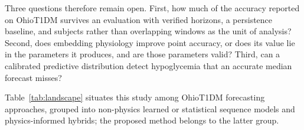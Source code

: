 \documentclass[journal]{IEEEtran}
\begin{document}
Three questions therefore remain open. First, how much of the accuracy reported on OhioT1DM survives an evaluation with verified horizons, a persistence baseline, and subjects rather than overlapping windows as the unit of analysis? Second, does embedding physiology improve point accuracy, or does its value lie in the parameters it produces, and are those parameters valid? Third, can a calibrated predictive distribution detect hypoglycemia that an accurate median forecast misses?

Table~\ref{tab:landscape} situates this study among OhioT1DM forecasting approaches, grouped into non-physics learned or statistical sequence models and physics-informed hybrids; the proposed method belongs to the latter group.

\begin{table}[t]
\centering
\caption{Landscape comparison of OhioT1DM blood-glucose forecasting studies by architecture family (30/60/90/120-minute horizons)}
\label{tab:landscape}
\tiny
{}
\end{table}
\end{document}
